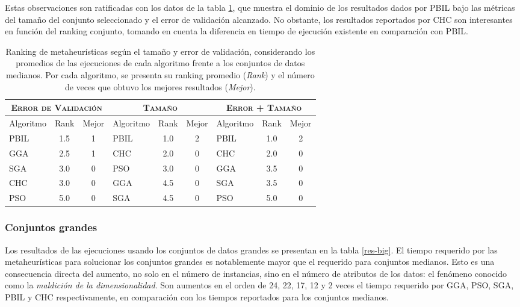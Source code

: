 Estas observaciones son ratificadas con los datos de la tabla \ref{res-med-rank}, que muestra el dominio de los resultados dados por PBIL bajo las métricas del tamaño del conjunto seleccionado y el error de validación alcanzado. No obstante, los resultados reportados por CHC son interesantes en función del ranking conjunto, tomando en cuenta la diferencia en tiempo de ejecución existente en comparación con PBIL.

\begin{table}[h!]
\centering
\begin{tabular}{l c c|l c c|l c c}
\hline
\multicolumn{3}{c|}{\textsc{Error de Validación}}
	& \multicolumn{3}{c|}{\textsc{Tamaño}}
	& \multicolumn{3}{c}{\textsc{Error + Tamaño}} \\
\hline
Algoritmo & Rank & Mejor & Algoritmo & Rank & Mejor & Algoritmo & Rank & Mejor \\
\hline
\hline
PBIL & 1.5 & 1 & PBIL & 1.0 & 2 & PBIL & 1.0 & 2 \\
GGA  & 2.5 & 1 & CHC  & 2.0 & 0 & CHC  & 2.0 & 0 \\
SGA  & 3.0 & 0 & PSO  & 3.0 & 0 & GGA  & 3.5 & 0 \\
CHC  & 3.0 & 0 & GGA  & 4.5 & 0 & SGA  & 3.5 & 0 \\
PSO  & 5.0 & 0 & SGA  & 4.5 & 0 & PSO  & 5.0 & 0 \\
\hline
\end{tabular}
\caption[Ranking de metaheurísticas según el tamaño y error de validación en conjuntos de datos medianos]{Ranking de metaheurísticas según el tamaño y error de validación, considerando los promedios de las ejecuciones de cada algoritmo frente a los conjuntos de datos medianos. Por cada algoritmo, se presenta su ranking promedio (\emph{Rank}) y el número de veces que obtuvo los mejores resultados (\emph{Mejor}).}
\label{res-med-rank}
\end{table}

\subsubsection{Conjuntos grandes}

Los resultados de las ejecuciones usando los conjuntos de datos grandes se presentan en la tabla \ref{res-big}. El tiempo requerido por las metaheurísticas para solucionar los conjuntos grandes es notablemente mayor que el requerido para conjuntos medianos. Esto es una consecuencia directa del aumento, no solo en el número de instancias, sino en el número de atributos de los datos: el fenómeno conocido como la \guillemotleft\emph{maldición de la dimensionalidad}\guillemotright. Son aumentos en el orden de 24, 22, 17, 12 y 2 veces el tiempo requerido por GGA, PSO, SGA, PBIL y CHC respectivamente, en comparación con los tiempos reportados para los conjuntos medianos.

